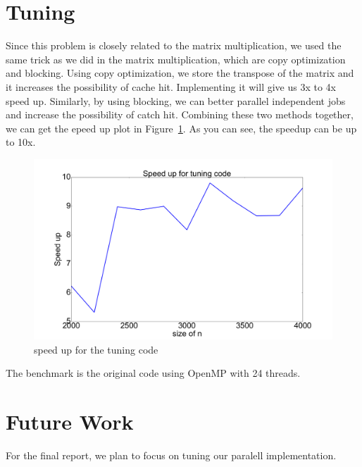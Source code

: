 \documentclass[11pt]{article}
\begin{document}
	\section{Tuning}
	Since this problem is closely related to the matrix multiplication, we used the same trick as we did in the matrix multiplication, which are copy optimization and blocking. Using copy optimization, we store the transpose of the matrix and it increases the possibility of cache hit. Implementing it will give us 3x to 4x speed up. Similarly, by using blocking, we can better parallel independent jobs and increase the possibility of catch hit. Combining these two methods together, we can get the epeed up plot in Figure~\ref{su}. As you can see, the speedup can be up to 10x.
	\begin{figure}
	\caption{speed up for the tuning code}
	\label{su}
	\includegraphics[height=0.4\textwidth, width=\textwidth]{speed_up.png}
	\end{figure}



	The benchmark is the original code using OpenMP with 24 threads.
	\section*{Future Work}

	For the final report, we plan to focus on tuning our paralell implementation.

	
\end{document}
